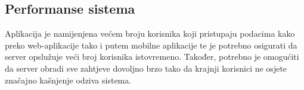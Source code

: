 \subsection{Performanse sistema}
Aplikacija je namijenjena većem broju korisnika koji pristupaju podacima kako preko web-aplikacije tako i putem mobilne aplikacije te je potrebno osigurati da server opslužuje veći broj korisnika istovremeno. Također, potrebno je omogućiti da server obradi sve zahtjeve dovoljno brzo tako da krajnji korisnici ne osjete značajno kašnjenje odziva sistema.


